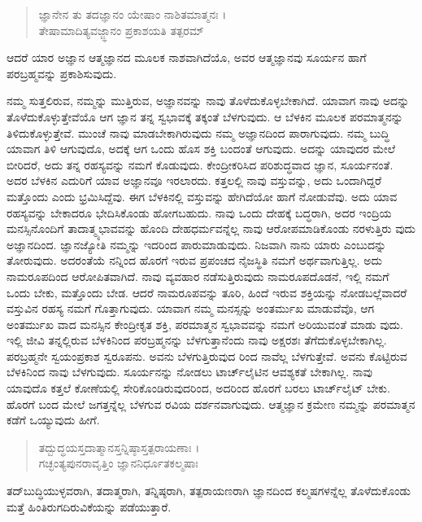 \begin{verse}
ಜ್ಞಾನೇನ ತು ತದಜ್ಞಾನಂ ಯೇಷಾಂ ನಾಶಿತಮಾತ್ಮನಃ ।\\ತೇಷಾಮಾದಿತ್ಯವಜ್ಜ್ಞಾನಂ ಪ್ರಕಾಶಯತಿ ತತ್ಪರಮ್ 
\end{verse}

{\small ಆದರೆ ಯಾರ ಅಜ್ಞಾನ ಆತ್ಮಜ್ಞಾನದ ಮೂಲಕ ನಾಶವಾಗಿದೆಯೊ, ಅವರ ಆತ್ಮಜ್ಞಾನವು ಸೂರ್ಯನ ಹಾಗೆ ಪರಬ್ರಹ್ಮವನ್ನು ಪ್ರಕಾಶಿಸುವುದು.}

ನಮ್ಮ ಸುತ್ತಲಿರುವ, ನಮ್ಮನ್ನು ಮುತ್ತಿರುವ, ಅಜ್ಞಾನವನ್ನು ನಾವು ತೊಳೆದುಕೊಳ್ಳಬೇಕಾಗಿದೆ. ಯಾವಾಗ ನಾವು ಅದನ್ನು ತೊಳೆದುಕೊಳ್ಳುತ್ತೇವೆಯೊ ಆಗ ಜ್ಞಾನ ತನ್ನ ಸ್ವಭಾವಕ್ಕೆ ತಕ್ಕಂತೆ ಬೆಳಗುವುದು. ಆ ಬೆಳಕಿನ ಮೂಲಕ ಪರಮಾತ್ಮನನ್ನು ತಿಳಿದುಕೊಳ್ಳುತ್ತೇವೆ. ಮುಂಚೆ ನಾವು ಮಾಡಬೇಕಾಗಿರುವುದು ನಮ್ಮ ಅಜ್ಞಾನದಿಂದ ಪಾರಾಗುವುದು. ನಮ್ಮ ಬುದ್ಧಿ ಯಾವಾಗ ತಿಳಿ ಆಗುವುದೊ, ಅದಕ್ಕೆ ಆಗ ಒಂದು ಹೊಸ ಶಕ್ತಿ ಬಂದಂತೆ ಆಗುವುದು. ಅದನ್ನು ಯಾವುದರ ಮೇಲೆ ಬೀರಿದರೆ, ಅದು ತನ್ನ ರಹಸ್ಯವನ್ನು ನಮಗೆ ಕೊಡುವುದು. ಕೇಂದ್ರೀಕರಿಸಿದ ಪರಿಶುದ್ಧವಾದ ಜ್ಞಾನ, ಸೂರ್ಯನಂತೆ. ಅದರ ಬೆಳಕಿನ ಎದುರಿಗೆ ಯಾವ ಅಜ್ಞಾನವೂ ಇರಲಾರದು. ಕತ್ತಲಲ್ಲಿ ನಾವು ವಸ್ತುವನ್ನು, ಅದು ಒಂದಾಗಿದ್ದರೆ ಮತ್ತೊಂದು ಎಂದು ಭ್ರಮಿಸಿದ್ದೆವು. ಈಗ ಬೆಳಕಿನಲ್ಲಿ ವಸ್ತುವನ್ನು ಹೇಗಿದೆಯೋ ಹಾಗೆ ನೋಡುವೆವು. ಅದು ಯಾವ ರಹಸ್ಯವನ್ನು ಬೇಕಾದರೂ ಭೇದಿಸಿಕೊಂಡು ಹೋಗಬಹುದು. ನಾವು ಒಂದು ದೇಹಕ್ಕೆ ಬದ್ಧರಾಗಿ, ಅದರ ಇಂದ್ರಿಯ ಮನಸ್ಸಿನೊಂದಿಗೆ ತಾದಾತ್ಮ್ಯಭಾವವನ್ನು ಹೊಂದಿ ದೇಹಧರ್ಮವನ್ನೆಲ್ಲ ನಾವು ಆರೋಪಮಾಡಿಕೊಂಡು ನರಳುತ್ತಿರು ವುದು ಅಜ್ಞಾನದಿಂದ. ಜ್ಞಾನಜ್ಯೋತಿ ನಮ್ಮನ್ನು ಇದರಿಂದ ಪಾರುಮಾಡುವುದು. ನಿಜವಾಗಿ ನಾನು ಯಾರು ಎಂಬುದನ್ನು ತೋರುವುದು. ಅದರಂತೆಯೆ ನನ್ನಿಂದ ಹೊರಗೆ ಇರುವ ಪ್ರಪಂಚದ ನೈಜಸ್ಥಿತಿ ನಮಗೆ ಅರ್ಥವಾಗುತ್ತಿಲ್ಲ. ಅದು ನಾಮರೂಪದಿಂದ ಆರೋಪಿತವಾಗಿದೆ. ನಾವು ವ್ಯವಹಾರ ನಡೆಸುತ್ತಿರುವುದು ನಾಮರೂಪದೊಡನೆ, ಇಲ್ಲಿ ನಮಗೆ ಒಂದು ಬೇಕು, ಮತ್ತೊಂದು ಬೇಡ. ಆದರೆ ನಾಮರೂಪವನ್ನು ತೂರಿ, ಹಿಂದೆ ಇರುವ ಶಕ್ತಿಯನ್ನು ನೋಡಬಲ್ಲೆವಾದರೆ ವಸ್ತುವಿನ ರಹಸ್ಯ ನಮಗೆ ಗೊತ್ತಾಗುವುದು. ಯಾವಾಗ ನಮ್ಮ ಮನಸ್ಸನ್ನು ಅಂತರ್ಮುಖ ಮಾಡುವೆವೊ, ಆಗ ಅಂತರ್ಮುಖ ವಾದ ಮನಸ್ಸಿನ ಕೇಂದ್ರೀಕೃತ ಶಕ್ತಿ, ಪರಮಾತ್ಮನ ಸ್ವಭಾವವನ್ನು ನಮಗೆ ಅರಿಯುವಂತೆ ಮಾಡು ವುದು. ಇಲ್ಲಿ ಜೀವಿ ತನ್ನಲ್ಲಿರುವ ಬೆಳಕಿನಿಂದ ಪರಬ್ರಹ್ಮನನ್ನು ಬೆಳಗುತ್ತಾನೆಂದು ನಾವು ಅಕ್ಷರಶಃ ತೆಗೆದುಕೊಳ್ಳಬೇಕಾಗಿಲ್ಲ. ಪರಬ್ರಹ್ಮನೇ ಸ್ವಯಂಪ್ರಕಾಶ ಸ್ವರೂಪನು. ಅವನು ಬೆಳಗುತ್ತಿರುವುದ ರಿಂದ ನಾವೆಲ್ಲ ಬೆಳಗುತ್ತೇವೆ. ಅವನು ಕೊಟ್ಟಿರುವ ಬೆಳಕಿನಿಂದ ನಾವು ಬೆಳಗುವುದು. ಸೂರ್ಯನನ್ನು ನೋಡಲು ಟಾರ್ಚ್​ಲೈಟಿನ ಆವಶ್ಯಕತೆ ಬೇಕಾಗಿಲ್ಲ. ನಾವು ಯಾವುದೊ ಕತ್ತಲೆ ಕೋಣೆಯಲ್ಲಿ ಸೇರಿಕೊಂಡಿರುವುದರಿಂದ, ಅದರಿಂದ ಹೊರಗೆ ಬರಲು ಟಾರ್ಚ್​ಲೈಟ್ ಬೇಕು. ಹೊರಗೆ ಬಂದ ಮೇಲೆ ಜಗತ್ತನ್ನೆಲ್ಲ ಬೆಳಗುವ ರವಿಯ ದರ್ಶನವಾಗುವುದು. ಆತ್ಮಜ್ಞಾನ ಕ್ರಮೇಣ ನಮ್ಮನ್ನು ಪರಮಾತ್ಮನ ಕಡೆಗೆ ಒಯ್ಯುವುದು ಹೀಗೆ.

\begin{verse}
ತದ್ಬುದ್ಧಯಸ್ತದಾತ್ಮಾನಸ್ತನ್ನಿಷ್ಠಾಸ್ತತ್ಪರಾಯಣಾಃ ।\\ಗಚ್ಛಂತ್ಯಪುನರಾವೃತ್ತಿಂ ಜ್ಞಾನನಿರ್ಧೂತಕಲ್ಮಷಾಃ 
\end{verse}

{\small ತದ್​ಬುದ್ಧಿಯುಳ್ಳವರಾಗಿ, ತದಾತ್ಮರಾಗಿ, ತನ್ನಿಷ್ಠರಾಗಿ, ತತ್ಪರಾಯಣರಾಗಿ ಜ್ಞಾನದಿಂದ ಕಲ್ಮಷಗಳನ್ನೆಲ್ಲ ತೊಳೆದುಕೊಂಡು ಮತ್ತೆ ಹಿಂತಿರುಗದಿರುವಿಕೆಯನ್ನು ಪಡೆಯುತ್ತಾರೆ.}

